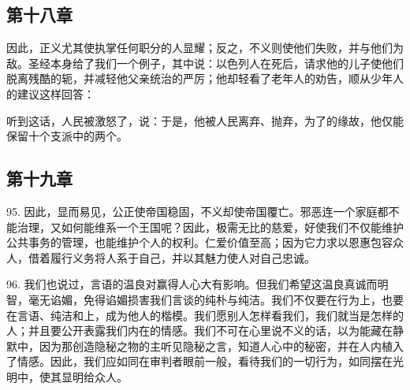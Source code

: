 
\subsection{第十八章}

\par

因此，正义尤其使执掌任何职分的人显耀；反之，不义则使他们失败，并与他们为敌。圣经本身给了我们一个例子，其中说：以色列人在死后，请求他的儿子使他们脱离残酷的轭，并减轻他父亲统治的严厉；他却轻看了老年人的劝告，顺从少年人的建议这样回答：\par

听到这话，人民被激怒了，说：于是，他被人民离弃、抛弃，为了的缘故，他仅能保留十个支派中的两个。\par


\subsection{第十九章}

\par

95. 因此，显而易见，公正使帝国稳固，不义却使帝国覆亡。邪恶连一个家庭都不能治理，又如何能维系一个王国呢？因此，极需无比的慈爱，好使我们不仅能维护公共事务的管理，也能维护个人的权利。仁爱价值至高；因为它力求以恩惠包容众人，借着履行义务将人系于自己，并以其魅力使人对自己忠诚。\par

96. 我们也说过，言语的温良对赢得人心大有影响。但我们希望这温良真诚而明智，毫无谄媚，免得谄媚损害我们言谈的纯朴与纯洁。我们不仅要在行为上，也要在言语、纯洁和上，成为他人的楷模。我们愿别人怎样看我们，我们就当是怎样的人；并且要公开表露我们内在的情感。我们不可在心里说不义的话，以为能藏在静默中，因为那创造隐秘之物的主听见隐秘之言，知道人心中的秘密，并在人内植入了情感。因此，我们应如同在审判者眼前一般，看待我们的一切行为，如同摆在光明中，使其显明给众人。\par

